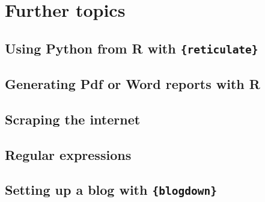 \documentclass[]{gitbook}
\begin{document}
\hypertarget{further-topics}{%
\section{Further topics}\label{further-topics}}

\hypertarget{using-python-from-r-with-reticulate}{%
\subsection{\texorpdfstring{Using Python from R with \texttt{\{reticulate\}}}{Using Python from R with \{reticulate\}}}\label{using-python-from-r-with-reticulate}}

\hypertarget{generating-pdf-or-word-reports-with-r}{%
\subsection{Generating Pdf or Word reports with R}\label{generating-pdf-or-word-reports-with-r}}

\hypertarget{scraping-the-internet}{%
\subsection{Scraping the internet}\label{scraping-the-internet}}

\hypertarget{regular-expressions}{%
\subsection{Regular expressions}\label{regular-expressions}}

\hypertarget{setting-up-a-blog-with-blogdown}{%
\subsection{\texorpdfstring{Setting up a blog with \texttt{\{blogdown\}}}{Setting up a blog with \{blogdown\}}}\label{setting-up-a-blog-with-blogdown}}


\end{document}

